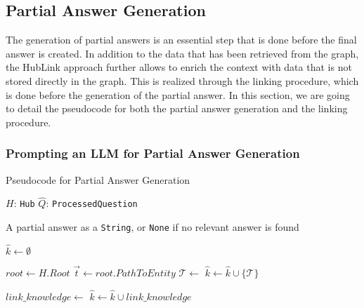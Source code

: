\subsection{Partial Answer Generation}

The generation of partial answers is an essential step that is done before the final answer is created. In addition to the data that has been retrieved from the graph, the HubLink approach further allows to enrich the context with data that is not stored directly in the graph. This is realized through the linking procedure, which is done before the generation of the partial answer. In this section, we are going to detail the pseudocode for both the partial answer generation and the linking procedure.

\subsubsection{Prompting an LLM for Partial Answer Generation}
\label{sec:prompting_an_llm_for_partial_answer_generation}

\begin{algorithm}[t]
\caption{Pseudocode for Partial Answer Generation}
\label{alg:get_partial_answer}
\begin{algorithmic}[1]

\Require
    \Statex $H$: \texttt{Hub} 
    \Statex $\hat{Q}$: \texttt{ProcessedQuestion} 

\Ensure
    \Statex A partial answer as a \texttt{String}, or \texttt{None} if no relevant answer is found
    
\Statex
{}
    \State $\hat{k} \gets \emptyset$ 

    \State $root \gets H.Root$
      
        \State $\vec{t} \gets root.PathToEntity$  
        \State $\mathcal{T} \gets $  
        \State $\hat{k} \gets \hat{k} \cup \{\mathcal{T}\}$ 
    \EndIf

    \State $link\_knowledge \gets$ 
    \State $\hat{k} \gets \hat{k} \cup link\_knowledge$

    \State \Return {}
\EndFunction

\end{algorithmic}
\end{algorithm}

